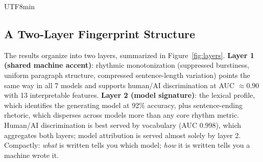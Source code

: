 \documentclass[11pt,a4paper]{article}
\begin{document}
\begin{CJK}{UTF8}{min}
\subsection{A Two-Layer Fingerprint Structure}

The results organize into two layers, summarized in Figure~\ref{fig:layers}. \textbf{Layer 1 (shared machine accent)}: rhythmic monotonization (suppressed burstiness, uniform paragraph structure, compressed sentence-length variation) points the same way in all 7 models and supports human/AI discrimination at AUC $\approx 0.90$ with 13 interpretable features. \textbf{Layer 2 (model signature)}: the lexical profile, which identifies the generating model at 92\% accuracy, plus sentence-ending rhetoric, which disperses across models more than any core rhythm metric. Human/AI discrimination is best served by vocabulary (AUC 0.998), which aggregates both layers; model attribution is served almost solely by layer 2. Compactly: \emph{what} is written tells you which model; \emph{how} it is written tells you a machine wrote it.


\end{CJK}
\end{document}
